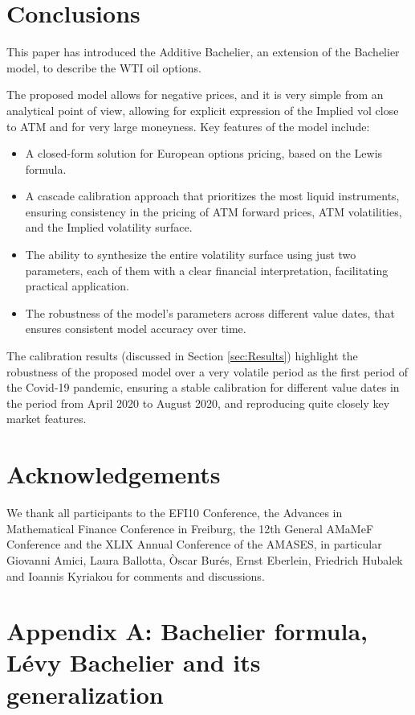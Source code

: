 \documentclass[12pt]{article}
\theoremstyle{definition}
\theoremstyle{remark}
\numberwithin{theorem}{section}
\numberwithin{proposition}{section}
\numberwithin{lemma}{section}
\numberwithin{corollary}{section}
\numberwithin{definition}{section}
\numberwithin{remark}{section}
\numberwithin{example}{section}
\begin{document}
\section{Conclusions}
\label{sec:Conclusions}
This paper has introduced the Additive Bachelier, an extension of the Bachelier model, to describe the 
WTI oil options.

\smallskip

The proposed model allows for negative prices, and it is very simple from an analytical point of view, 
allowing for explicit expression of the Implied vol close to ATM and for very large moneyness. %
Key features of the model include:
\begin{itemize}
    \item A closed-form solution for European options pricing, based on the Lewis formula.
    \item A cascade calibration approach that prioritizes the most liquid instruments, ensuring consistency in the pricing of ATM forward prices, ATM volatilities, and the Implied volatility surface.
\item The ability to synthesize the entire volatility surface using just two parameters, each of them with a clear financial interpretation, facilitating practical application.
\item The robustness of the model's parameters across different value dates, that ensures consistent model accuracy over time.
\end{itemize}

The calibration results (discussed in Section \ref{sec:Results}) highlight the robustness of the proposed model over a very volatile period as the first period of the Covid-19 pandemic, ensuring a stable calibration for different value dates in the period from April 2020 to August 2020, and reproducing quite closely key market features.
\section*{Acknowledgements}
We thank all participants to the EFI10 Conference, the Advances in Mathematical Finance Conference in Freiburg,  the 12th General AMaMeF Conference and the XLIX Annual Conference of the AMASES, in particular Giovanni Amici, Laura Ballotta, Òscar Burés, Ernst Eberlein, Friedrich Hubalek and Ioannis Kyriakou for comments and discussions.

\section*{Appendix A: Bachelier formula, L\'evy Bachelier and its generalization}
\label{app:Bachelier_formula}
\end{document}
